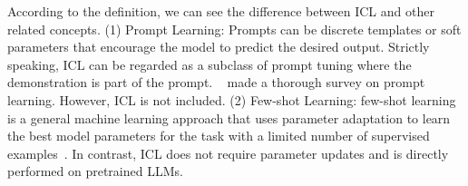 According to the definition, we can see the difference between ICL and other related concepts. (1) Prompt Learning: Prompts can be discrete templates or soft parameters that encourage the model to predict the desired output. Strictly speaking, ICL can be regarded as a subclass of prompt tuning where the demonstration is part of the prompt. %
~\citet{liu2021pre} made a thorough survey on prompt learning. However, ICL is not included. (2) Few-shot Learning: few-shot learning is a general machine learning approach that uses parameter adaptation to learn the best model parameters for the task with a limited number of supervised examples~\cite{wang2019few}. In contrast, ICL does not require parameter updates and is directly performed on pretrained LLMs.


